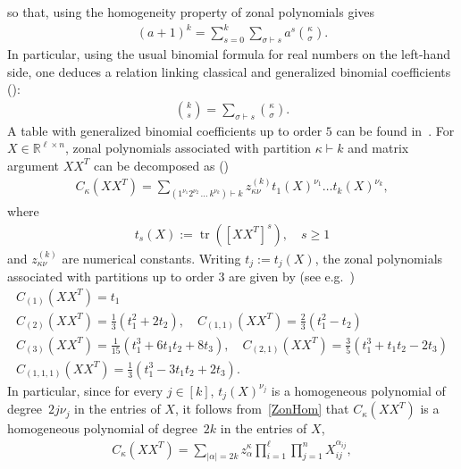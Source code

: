\documentclass[AHL,Unicode,longabstracts,published]{cedram}
\DeclareMathOperator{\Tr}{tr}
\newcommand{\R}{\mathbb{R}}
\begin{document}
so that, using the homogeneity property of zonal polynomials gives
\begin{gather*}
(a+1)^{k} =
\sum_{s=0}^{k}
\sum_{\sigma \vdash s} a^s \binom{\kappa}{\sigma}.
\end{gather*}
In particular, using the usual binomial formula for real numbers on the left-hand side, one deduces a relation linking classical and generalized binomial coefficients (\cite[Eq.~(4.5.2)]{BFZP}):
\begin{gather*}
\binom{k}{s} = \sum_{\sigma \vdash s} \binom{\kappa}{\sigma}.
\end{gather*}
A table with generalized binomial coefficients up to order $5$ can be found in~\cite[Table~4.4.1]{BFZP}. For $X\in \R^{\ell\times n}$, zonal polynomials associated with partition $\kappa \vdash k$ and matrix argument $XX^T$ can be decomposed as (\cite[Theorem~4.3.6]{BFZP})
\begin{gather}\label{ZonHom}
C_{\kappa}(XX^T) = \sum_{\left(1^{\nu_1} 2^{\nu_2}\,\ldots\, k^{\nu_k}\right) \vdash k } z_{\kappa \nu}^{(k)} t_1(X)^{\nu_1}\ldots t_k(X)^{\nu_k},
\end{gather}
where
\begin{gather}\label{ts}
t_{s}(X) := \Tr{\left(\left[XX^T\right]^s\right)}, \quad s\geq 1
\end{gather}
and $z_{\kappa \nu}^{(k)}$ are numerical constants. Writing $t_j:=t_j(X)$, the zonal polynomials associated with partitions up to order $3$ are given by (see e.g.~\cite[Table~4.3.1]{BFZP})
\begin{gather*}
C_{(1)}\left(XX^T\right) = t_1 \\
C_{(2)}\left(XX^T\right) = \frac{1}{3}\left(t_1^2+2t_2\right), \quad C_{(1,1)}\left(XX^T\right) = \frac{2}{3}\left(t_1^2-t_2\right)\\
C_{(3)}\left(XX^T\right) = \frac{1}{15}\left(t_1^3+6t_1t_2+8t_3\right),\quad C_{(2,1)}\left(XX^T\right) = \frac{3}{5}\left(t_1^3+t_1t_2-2t_3\right) \\
C_{(1,1,1)}\left(XX^T\right) = \frac{1}{3}\left(t_1^3-3t_1t_2+2t_3\right).
\end{gather*}
In particular, since for every $j \in [k]$, $t_j(X)^{\nu_j}$ is a homogeneous polynomial of degree~$2j\nu_j$ in the entries of $X$, it follows from~\eqref{ZonHom} that $C_{\kappa}(XX^T)$ is a homogeneous polynomial of degree~$2k$ in the entries of $X$,
\begin{gather}\label{HOM}
C_{\kappa}\left(XX^T\right) = \sum_{|\alpha|=2k} z_{\alpha}^{\kappa} \prod_{i=1}^{\ell} \prod_{j=1}^n X_{ij}^{\alpha_{ij}},
\end{gather}
\end{document}
